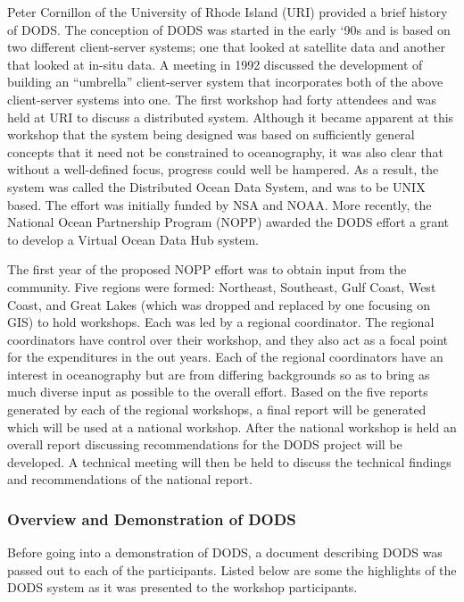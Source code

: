 Peter Cornillon of the University of Rhode Island (URI) provided a
brief history of DODS.  The conception of DODS was started in the
early `90s and is based on two different client-server systems; one
that looked at satellite data and another that looked at in-situ data.
A meeting in 1992 discussed the development of building an
``umbrella'' client-server system that incorporates both of the above
client-server systems into one.  The first workshop had forty
attendees and was held at URI to discuss a distributed system.
Although it became apparent at this workshop that the system being
designed was based on sufficiently general concepts that it need not
be constrained to oceanography, it was also clear that without a
well-defined focus, progress could well be hampered.  As a result, the
system was called the Distributed Ocean Data System, and was to be
UNIX based.  The effort was initially funded by NSA and NOAA.  More
recently, the National Ocean Partnership Program (NOPP) awarded the
DODS effort a grant to develop a Virtual Ocean Data Hub system.

The first year of the proposed NOPP effort was to obtain input from
the community.  Five regions were formed: Northeast, Southeast, Gulf
Coast, West Coast, and Great Lakes (which was dropped and replaced by
one focusing on GIS) to hold workshops.  Each was led by a regional
coordinator.  The regional coordinators have control over their
workshop, and they also act as a focal point for the expenditures in
the out years.  Each of the regional coordinators have an interest in
oceanography but are from differing backgrounds so as to bring as much
diverse input as possible to the overall effort.  Based on the five
reports generated by each of the regional workshops, a final report
will be generated which will be used at a national workshop.  After
the national workshop is held an overall report discussing
recommendations for the DODS project will be developed.  A technical
meeting will then be held to discuss the technical findings and
recommendations of the national report.

\subsubsection{Overview and Demonstration of  DODS}

Before going into a demonstration of DODS, a document describing DODS
was passed out to each of the participants.  Listed
below are some the highlights of the DODS system as it was presented
to the workshop participants.

